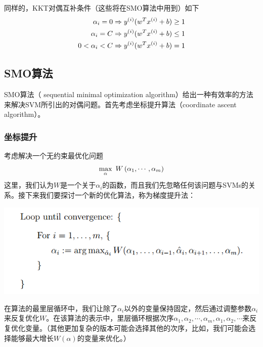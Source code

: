 同样的，KKT对偶互补条件（这些将在SMO算法中用到）如下
\begin{eqnarray}
\alpha_i=0 \Rightarrow {y}^{({i})}(w^T{x}^{({i})}+b)\geq 1\\
\alpha_i=C \Rightarrow {y}^{({i})}(w^T{x}^{({i})}+b)\leq 1\\
0<\alpha_i<C \Rightarrow {y}^{({i})}(w^T{x}^{({i})}+b)=1
\end{eqnarray}

\subsection{SMO算法}
SMO算法（ sequential minimal optimization algorithm）给出一种有效率的方法来解决SVM所引出的对偶问题。首先考虑坐标提升算法（coordinate ascent algorithm）。

\subsubsection{坐标提升}
考虑解决一个无约束最优化问题
\begin{eqnarray}
\max_\alpha\ W\left( {\alpha}_{1},\cdots,{\alpha}_{m} \right)
\end{eqnarray}
这里，我们认为$W$是一个关于$\alpha_i$的函数，而且我们先忽略任何该问题与SVMs的关系。接下来我们要探讨一个新的优化算法，称为梯度提升法：

\begin{center}
\includegraphics[scale=1]{../figures/SVM4.PNG} 
\end{center}

在算法的最里层循环中，我们让除了$\alpha_i$以外的变量保持固定，然后通过调整参数$\alpha_i$来反复优化$W$。在该算法的表示中，里层循环根据次序$\alpha_1,\alpha_2,\cdots,\alpha_m,\alpha_1,\alpha_2,\cdots$来反复优化变量。（其他更加复杂的版本可能会选择其他的次序，比如，我们可能会选择能够最大增长$W(\alpha)$的变量来优化。）


